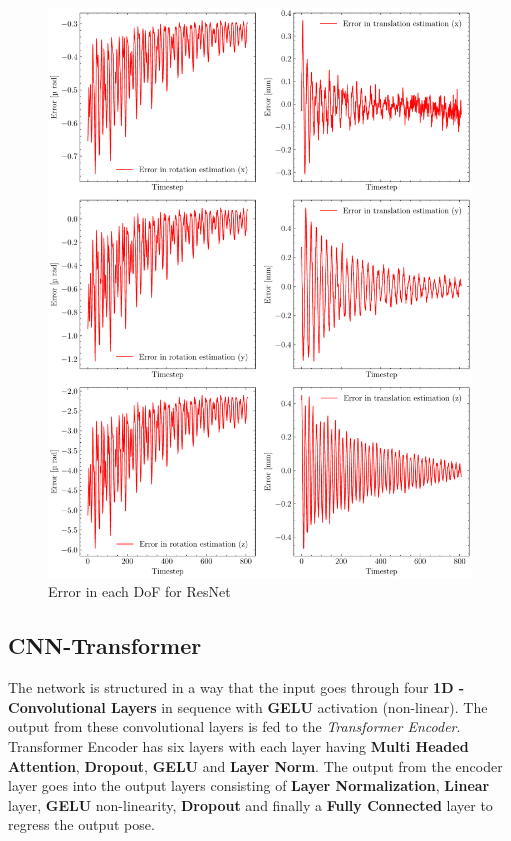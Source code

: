 \begin{figure}[H]
    \centering
    \includegraphics[scale=0.52]{images/fig_chapter4/nn_related/error_in_predicted_vs_ground_truth_resnet.pdf}
    \caption{Error in each DoF for ResNet}
    \label{fig:resnet_error}
\end{figure}


\subsection{CNN-Transformer}
The network is structured in a way that the input goes through four \textbf{1D - Convolutional Layers} in sequence with \textbf{GELU} activation (non-linear). The output from these convolutional layers is fed to the \textit{Transformer Encoder}. Transformer Encoder has six layers with each layer having \textbf{Multi Headed Attention}, \textbf{Dropout}, \textbf{GELU} and \textbf{Layer Norm}. The output from the encoder layer goes into the output layers consisting of \textbf{Layer Normalization}, \textbf{Linear} layer, \textbf{GELU} non-linearity, \textbf{Dropout} and finally a \textbf{Fully Connected} layer to regress the output pose.

